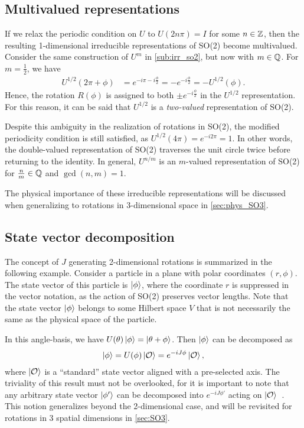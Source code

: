 \subsection{Multivalued representations}\label{sub:multi_so2}
If we relax the periodic condition on $U$ to $U(2n\pi) = I$ for some $n\in\mathbb{Z}$, then the resulting 1-dimensional irreducible representations of SO(2) become multivalued. Consider the same construction of $U^m$ in \cref{sub:irr_so2}, but now with $m\in\mathbb{Q}$. For $m=\frac{1}{2}$, we have
\begin{align*}
    U^{1/2}(2\pi + \phi) &= e^{-i\pi - i\frac{\phi}{2}} = -e^{-i\frac{\phi}{2}} = -U^{1/2}(\phi).
\end{align*}
Hence, the rotation $R(\phi)$ is assigned to both $\pm e^{-i\frac{\phi}{2}}$ in the $U^{1/2}$ representation. For this reason, it can be said that $U^{1/2}$ is a \textit{two-valued} representation of SO(2).

Despite this ambiguity in the realization of rotations in SO(2), the modified periodicity condition is still satisfied, as $U^{1/2}(4\pi) = e^{-i2\pi} = 1$. In other words, the double-valued representation of SO(2) traverses the unit circle twice before returning to the identity. In general, $U^{n/m}$ is an $m$-valued representation of SO(2) for $\frac{n}{m}\in\mathbb{Q}$ and $\gcd(n,m)=1$.

The physical importance of these irreducible representations will be discussed when generalizing to rotations in 3-dimensional space in \cref{sec:phys_SO3}.

\subsection{State vector decomposition}\label{sub:SO2_decomp}
The concept of $J$ generating 2-dimensional rotations is summarized in the following example. Consider a particle in a plane with polar coordinates $(r,\phi)$. The state vector of this particle is $\ket{\phi}$, where the coordinate $r$ is suppressed in the vector notation, as the action of SO(2) preserves vector lengths. Note that the state vector $\ket{\phi}$ belongs to some Hilbert space $V$ that is not necessarily the same as the physical space of the particle.

In this angle-basis, we have $U(\theta)\ket{\phi} = \ket{\theta+\phi}$. Then $\ket{\phi}$ can be decomposed as
\begin{align*}
    \ket{\phi} = U(\phi)\ket{\mathcal{O}} = e^{-iJ\phi}\ket{\mathcal{O}},
\end{align*}
where $\ket{\mathcal{O}}$ is a ``standard'' state vector aligned with a pre-selected axis. The triviality of this result must not be overlooked, for it is important to note that any arbitrary state vector $\ket{\phi'}$ can be decomposed into $e^{-iJ\phi'}$ acting on $\ket{\mathcal{O}}$~\cite{Tung1985}. This notion generalizes beyond the 2-dimensional case, and will be revisited for rotations in 3 spatial dimensions in \cref{sec:SO3}.

